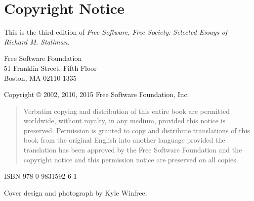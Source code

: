 \chapter*{Copyright Notice}
\null
\vfill
\noindent
This is the third edition of \textit{Free Software, Free Society: Selected Essays of Richard M. Stallman.}

\bigskip

\noindent
Free Software Foundation\\
51 Franklin Street, Fifth Floor\\
Boston, MA 02110-1335


\bigskip
\noindent
Copyright \copyright{} 2002, 2010, 2015 Free Software Foundation, Inc.

\begin{quote}
Verbatim copying and distribution of this entire book are permitted
worldwide, without royalty, in any medium, provided this notice is
preserved. Permission is granted to copy and distribute translations
of this book from the original English into another language provided
the translation has been approved by the Free Software Foundation and
the copyright notice and this permission notice are preserved on all
copies.
\end{quote}

\bigskip
\noindent
ISBN 978-0-9831592-6-1

\bigskip
\bigskip
\noindent
Cover design and photograph by Kyle Winfree.
